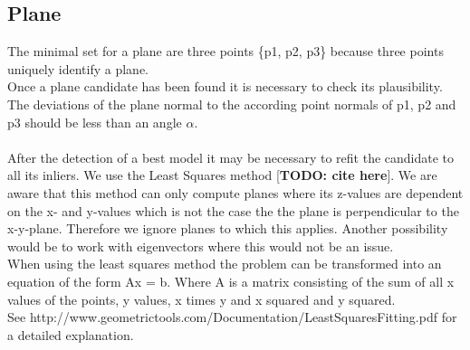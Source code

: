 \documentclass[../ClassicThesis.tex]{subfiles}
\begin{document}
\subsection{Plane}
The minimal set for a plane are three points \{p1, p2, p3\} because three points uniquely identify a plane.\\
Once a plane candidate has been found it is necessary to check its plausibility. The deviations of the plane normal to the according point normals of p1, p2 and p3 should be less than an angle $\alpha$.\\
\*\\
After the detection of a best model it may be necessary to refit the candidate to all its inliers. We use the Least Squares method [\textbf{TODO: cite here}]. We are aware that this method can only compute planes where its z-values are dependent on the x- and y-values which is not the case the the plane is perpendicular to the x-y-plane. Therefore we ignore planes to which this applies. Another possibility would be to work with eigenvectors where this would not be an issue.\\
When using the least squares method the problem can be transformed into an equation of the form Ax = b. Where A is a matrix consisting of the sum of all x values of the points, y values, x times y and x squared and y squared. \\
See http://www.geometrictools.com/Documentation/LeastSquaresFitting.pdf for a detailed explanation.
\end{document}
